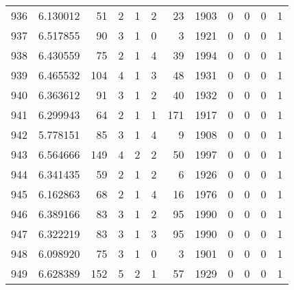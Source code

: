 \begin{tabular}{lrrrrrrrrrrr}
936 &  6.130012 &   51 &      2 &        1 &      2 &              23 &  1903 &               0 &               0 &               0 &               1 \\
937 &  6.517855 &   90 &      3 &        1 &      0 &               3 &  1921 &               0 &               0 &               0 &               1 \\
938 &  6.430559 &   75 &      2 &        1 &      4 &              39 &  1994 &               0 &               0 &               0 &               1 \\
939 &  6.465532 &  104 &      4 &        1 &      3 &              48 &  1931 &               0 &               0 &               0 &               1 \\
940 &  6.363612 &   91 &      3 &        1 &      2 &              40 &  1932 &               0 &               0 &               0 &               1 \\
941 &  6.299943 &   64 &      2 &        1 &      1 &             171 &  1917 &               0 &               0 &               0 &               1 \\
942 &  5.778151 &   85 &      3 &        1 &      4 &               9 &  1908 &               0 &               0 &               0 &               1 \\
943 &  6.564666 &  149 &      4 &        2 &      2 &              50 &  1997 &               0 &               0 &               0 &               1 \\
944 &  6.341435 &   59 &      2 &        1 &      2 &               6 &  1926 &               0 &               0 &               0 &               1 \\
945 &  6.162863 &   68 &      2 &        1 &      4 &              16 &  1976 &               0 &               0 &               0 &               1 \\
946 &  6.389166 &   83 &      3 &        1 &      2 &              95 &  1990 &               0 &               0 &               0 &               1 \\
947 &  6.322219 &   83 &      3 &        1 &      3 &              95 &  1990 &               0 &               0 &               0 &               1 \\
948 &  6.098920 &   75 &      3 &        1 &      0 &               3 &  1901 &               0 &               0 &               0 &               1 \\
949 &  6.628389 &  152 &      5 &        2 &      1 &              57 &  1929 &               0 &               0 &               0 &               1 \\

\end{tabular}

